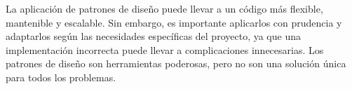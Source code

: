 La aplicación de patrones de diseño puede llevar a un código más flexible, mantenible y escalable. Sin embargo, es importante aplicarlos con prudencia y adaptarlos según las necesidades específicas del proyecto, ya que una implementación incorrecta puede llevar a complicaciones innecesarias. Los patrones de diseño son herramientas poderosas, pero no son una solución única para todos los problemas.

